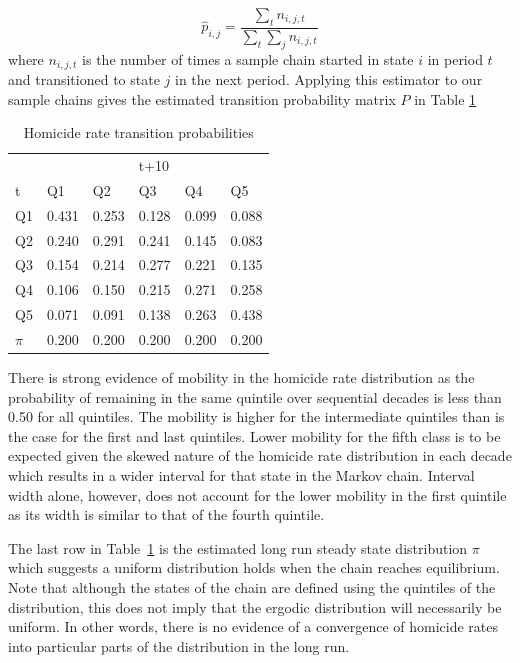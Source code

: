 \documentclass[11pt, titlepage]{article}
\begin{document}
\begin{equation}
\hat{p}_{i,j} = \frac{\sum_t n_{i,j,t}}{\sum_t \sum_j n_{i,j,t}} 
\label{e:cm}
\end{equation}
where $n_{i,j,t}$ is the number of times a sample chain started in state $i$
in period $t$ and transitioned to state $j$ in the next period. Applying this estimator
to our sample chains gives the  estimated transition
probability matrix $P$ in Table \ref{t:cm}

\begin{table}
  \centering
  \small
\begin{tabular}{|l|lllll|}\hline
   &  &  &t+10& & \\
  t&Q1&Q2&Q3&Q4&Q5\\
  \hline
   Q1& 0.431&0.253&0.128&0.099&0.088\\
   Q2& 0.240&0.291&0.241&0.145&0.083\\
   Q3& 0.154&0.214&0.277&0.221&0.135\\
   Q4& 0.106&0.150&0.215&0.271&0.258\\
   Q5& 0.071&0.091&0.138&0.263&0.438\\
    \hline
    $\pi$&0.200&0.200&0.200&0.200&0.200\\
    \hline
\end{tabular}
\caption{Homicide rate transition probabilities}
\label{t:cm}
\end{table}

There is strong evidence of mobility in the homicide rate distribution
as the probability of remaining in the same quintile over sequential
decades is less than 0.50 for all quintiles. The mobility is higher for
the intermediate quintiles than is the case for the first and last
quintiles. Lower mobility for the fifth class is to be expected given
the skewed nature of the homicide rate distribution in each decade which
results in a wider interval for that state in the Markov chain. Interval
width alone, however, does not account for the lower mobility in the
first quintile as its width is similar to that of the fourth quintile.

The last row in Table~\ref{t:cm} is the estimated long run steady state
distribution $\pi$ which suggests a uniform distribution holds when the chain
reaches equilibrium. Note that although the states of the chain are
defined using the quintiles of the distribution, this does not imply
that the ergodic distribution will necessarily be uniform. In other
words, there is no evidence of a convergence of homicide rates into
particular parts of the distribution in the long run.
\end{document}
